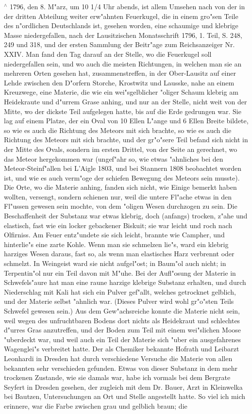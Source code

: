 \documentclass[a4paper, 11pt, oneside, polutonikogreek, german]{article}
\begin{document}
$^\wedge$ 1796, den 8. M"arz, um 10 1/4 Uhr abends, ist allem Umsehen nach von der in der dritten Abteilung weiter erw"ahnten Feuerkugel, die in einem gro"sen Teile des n"ordlichen Deutschlands ist, gesehen worden, eine schaumige und klebrige Masse niedergefallen, nach der Lausitzischen Monatsschrift 1796, 1. Teil, S. 248, 249 und 318, und der ersten Sammlung der Beitr"age zum Reichsanzeiger Nr. XXIV. Man fand den Tag darauf an der Stelle, wo die Feuerkugel soll niedergefallen sein, und wo auch die meisten Richtungen, in welchen man sie an mehreren Orten gesehen hat, zusammenstreffen, in der Ober-Lausitz auf einer Lehde zwischen den D"orfern Storche, Krostwitz und Lausske, nahe an einem Kreuzwege, eine Materie, die wie ein wei"sgelblicher "oliger Schaum klebrig am Heidekraute und d"urrem Grase anhing, und nur an der Stelle, nicht weit von der Mitte, wo der dickste Teil aufgelegen hatte, bis auf die Erde gedrungen war. Sie lag auf einem Platze, der ein Oval von 10 Ellen L"ange und 6 Ellen Breite bildete, so wie es auch die Richtung des Meteors mit sich brachte, so wie es auch die Richtung des Meteors mit sich brachte, und der gr"o"sere Teil befand sich nicht in der Mitte des Ovals, sondern im ersten Drittel, von der Seite an gerechnet, wo das Meteor hergekommen war (ungef"ahr so, wie etwas "ahnliches bei den Meteor-Steinf"allen bei L'Aigle 1803, und bei Stannern 1808 beobachtet worden ist, und wie es auch verm"oge der schiefen Bewegung des Meteors sein musste). Die Orte, wo die Materie anhing, fanden sich nicht, wie Einige bemerkt haben wollten, versengt, sondern schienen nur, weil die untere Fl"ache etwas in den Fl"ussen gewesen sein mochte, von dem "oligen Wesen durchzogen zu sein. Die Beschaffenheit der Substanz war etwas klebrig, doch (anfangs) trocken, z"ahe und elastisch, fast wie ein locker gebackener Biskuit; sie war leicht und roch nach Olfirniss. Am Feuer entz"undete sie sich leicht, brannte wie Campher, und hinterlie"s eine zarte Kohle. Wenn man sie schmelzen lie"s, ward ein klebrig harziges Wesen daraus, fast so, als wenn man elastisches Harz verbrennt oder schmelzt. In Weingeist ward sie nicht aufgel"ost; in Baum"ol auch nicht; in Terpentin"ol nur ein Teil davon mit M"uhe. Bei der Aufl"osung der Materie in Schwefels"aure hat man eine raune harzige klebrige Substanz erhalten, und durch Niederschlag mit Kali hat sich ein Pulver gef"allt, welches getrocknet gelblich, und der Materie selbst "ahnlich war. (Dieses Pulver wird wohl gr"o"sten Teils Schwefel gewesen sein.) Aus dem Gew"achsreiche konnte die Materie nicht sein, weil wegen des unfruchtbaren Bodens dort nichts als Heidekraut und schlechtes d"urres Gras anzutreffen, und der Boden zum Teil mit einem wei"slichen Moose "uberdeckt war, und weil auch ein Teil der Materie sich "uber ein ausgefahrenes Wagenglei"s verbreitet hatte. Der als Chemiker bekannte Hofrath und Leibarzt Leonhardi in Dresden hat durch verschiedene Versuche die Materie von allen bekannten sehr verschieden gefunden. Etwas von dieser Substanz in dem mehr trockenen Zustande, wie sie damals war, habe ich vormals bei dem Bergrate Seyfert in Dresden gesehen, der zugleich mit dem Dr. Bauer, Arzt in Kleinwelka bei Bautzen, Untersuchungen an Ort und Stelle angestellt hatte. So viel ich mich erinnere, war die Farbe zwischen grau und gelblich braun; die 
\end{document}
